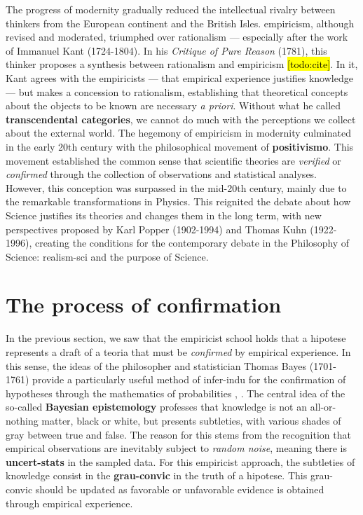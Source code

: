 \documentclass[./main_en.tex]{subfiles}
\begin{document}
\par The progress of modernity gradually reduced the intellectual rivalry between thinkers from the European continent and the British Isles. \gls{empiricism}, although revised and moderated, triumphed over \gls{rationalism} — especially after the work of Immanuel Kant (1724-1804). In his \textit{Critique of Pure Reason} (1781), this thinker proposes a synthesis between \gls{rationalism} and \gls{empiricism} \hl{[todo:cite]}. In it, Kant agrees with the empiricists — that empirical experience justifies knowledge — but makes a concession to \gls{rationalism}, establishing that theoretical concepts about the objects to be known are necessary \textit{a priori}. Without what he called \textbf{transcendental categories}, we cannot do much with the perceptions we collect about the external world. The hegemony of \gls{empiricism} in modernity culminated in the early 20th century with the philosophical movement of \textbf{\gls{positivismo}}. This movement established the common sense that scientific theories are \textit{verified} or \textit{confirmed} through the collection of observations and statistical analyses. However, this conception was surpassed in the mid-20th century, mainly due to the remarkable transformations in Physics. This reignited the debate about how Science justifies its theories and changes them in the long term, with new perspectives proposed by Karl Popper (1902-1994) and Thomas Kuhn (1922-1996), creating the conditions for the contemporary debate in the Philosophy of Science: \gls{realism-sci} and the purpose of Science.

\section{The process of confirmation} \label{sec:epis:bayes}

\par In the previous section, we saw that the empiricist school holds that a \gls{hipotese} represents a draft of a \gls{teoria} that must be \textit{confirmed} by empirical experience. In this sense, the ideas of the philosopher and statistician Thomas Bayes (1701-1761) provide a particularly useful method of \gls{infer-indu} for the confirmation of hypotheses through the mathematics of probabilities \cite{sep-epistemology-bayesian}, \cite{sprenger2019}. The central idea of the so-called \textbf{Bayesian epistemology} professes that knowledge is not an all-or-nothing matter, black or white, but presents subtleties, with various shades of gray between true and false. The reason for this stems from the recognition that empirical observations are inevitably subject to \textit{random noise}, meaning there is \textbf{\gls{uncert-stats}} in the sampled data. For this empiricist approach, the subtleties of knowledge consist in the \textbf{\gls{grau-convic}} in the truth of a \gls{hipotese}. This \gls{grau-convic} should be updated as favorable or unfavorable evidence is obtained through empirical experience.
\end{document}
